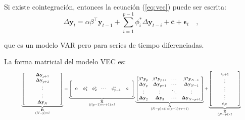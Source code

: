 Si existe cointegración, entonces la ecuación (\ref{eq:vec}) puede ser escrita:
\begin{equation}
 \label{eq:vecfull}
  \Delta \mathbf{y}_t = \alpha \beta^\intercal\mathbf{y}_{t-1} 
   + \sum_{i=1}^{p-1} \phi_i^*\Delta
   \mathbf{y}_{t-i}  + \mathbf{c} + \mathbf{\epsilon}_t \quad ,
   \end{equation}

   \noindent que es un modelo VAR pero para series de tiempo diferenciadas.

La forma matricial del modelo VEC es:
\begin{equation} \label{eq:vecmatrix}
\resizebox{0.9\hsize}{!}{$%
\underbrace{
                \left[ \begin{array}{ccc}
               \quad & \mathbf{\Delta y}_{p+1} & \quad \\ 
               \quad & \mathbf{\Delta y}_{p+2} & \quad \\
               \quad & \vdots & \quad \\ 
               \quad & \vdots & \quad \\  
               \quad & \mathbf{\Delta y}_N & \quad 
               \end{array} \right]}_{\substack{\mathbf{B}\\ (N-p) \times l }} =
   \underbrace{\left[ 
    \begin{array}{cccccc}
     \quad & \quad & \quad & \quad & \quad & \quad \\
     \alpha & \phi_1^*  & \phi_2^* & \cdots & \phi_{p-1}^* & \mathbf{c} \\  
     \quad &\quad &\quad & \quad & \quad & \quad
     \end{array} 
      \right]}_{\substack{ \mathbf{X}\\ (l(p-1)+r+1) \times l}}
\underbrace{\begin{bmatrix} 
   \beta^\intercal \mathbf{y}_{p} & 
   \beta^\intercal \mathbf{y}_{p+1}&
   \cdots & \beta^\intercal \mathbf{y}_{N-1} \\
   \mathbf{\Delta y}_p & \mathbf{\Delta y}_{p+1} & \cdots 
   & \mathbf{\Delta y}_{N-1} \\ 
   \vdots & \vdots & \ddots & \vdots \\
   \mathbf{\Delta y}_2 & \mathbf{\Delta y}_{3} & \cdots 
   & \mathbf{\Delta y}_{N-p+1} \\ 
   \end{bmatrix}}_{\substack{\mathbf{A} \\ (N-p) \times (l \times (p-1)+r+1) }}
+
\underbrace{\begin{bmatrix}
              \quad &\mathbf{\epsilon}_{p+1} & \quad \\ 
              \quad &\vdots & \quad\\ 
              \quad & \vdots & \quad\\
              \quad & \vdots & \quad\\
              \quad &\mathbf{\epsilon}_N & \quad
             \end{bmatrix}}_{\substack{\mathbf{E}\\ (N-p) \times l }} 
$}
\end{equation}
